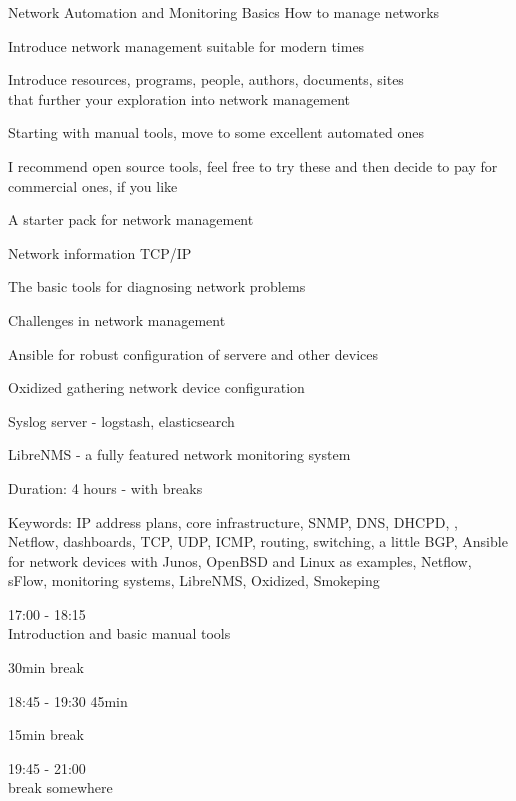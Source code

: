 \documentclass[Screen16to9,17pt]{foils}
\begin{document}
\mytitlepage
{Network Automation and Monitoring Basics}
{How to manage networks}

\hlkprofiluk




\begin{list2}
\item Introduce network management suitable for modern times
\item Introduce resources, programs, people, authors, documents, sites\\
 that further your exploration into network management
\item Starting with manual tools, move to some excellent automated ones
\item I recommend open source tools, feel free to try these and then decide to pay for commercial ones, if you like
\end{list2}




A starter pack for network management

\begin{list2}
\item Network information TCP/IP
\item The basic tools for diagnosing network problems
\item Challenges in network management
\item Ansible for robust configuration of servere and other devices
\item Oxidized gathering network device configuration
\item Syslog server - logstash, elasticsearch
\item LibreNMS - a fully featured network monitoring system
\end{list2}

Duration: 4 hours - with breaks

Keywords:
IP address plans, core infrastructure, SNMP, DNS, DHCPD, , Netflow, dashboards, TCP, UDP, ICMP, routing, switching, a little BGP, Ansible for network devices with Junos, OpenBSD and Linux as examples, Netflow, sFlow, monitoring systems, LibreNMS, Oxidized, Smokeping



\begin{list2}
\item 17:00 - 18:15\\
Introduction and basic manual tools
\item 30min break\\

\item 18:45 - 19:30 45min \\

\item 15min break\\

\item 19:45 - 21:00\\
break somewhere
\end{list2}
\end{document}
